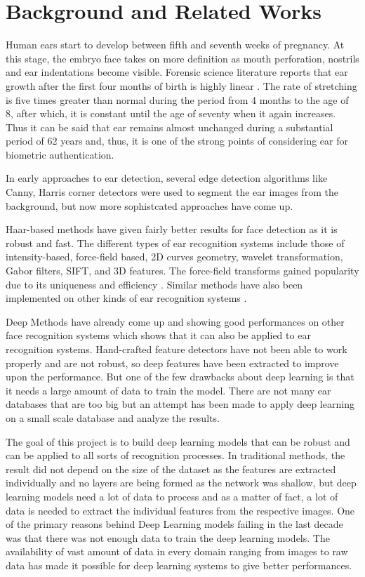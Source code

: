 \chapter{Background and Related Works}
\label{sec:back}

Human ears start to develop between fifth and seventh weeks of pregnancy. At this stage, the embryo face takes on more definition as mouth perforation, nostrils and ear indentations become visible. Forensic science literature reports that ear growth after the first four months of birth is highly linear \cite{Iannarelli}. The rate of stretching is five times greater than normal during the period from 4 months to the age of 8, after which, it is constant until the age of seventy when it again increases. Thus it can be said that ear remains almost unchanged during a substantial period of 62 years and, thus, it is one of the strong points of considering ear for biometric authentication.

In early approaches to ear detection, several edge detection algorithms like Canny\cite{canny}, Harris corner detectors\cite{harris} were used to segment the ear images from the background, but now more sophistcated approaches have come up.

Haar-based methods have given fairly better results for face detection as it is robust and fast. The different types of ear recognition systems include those of intensity-based, force-field based, 2D curves geometry, wavelet transformation, Gabor filters, SIFT, and 3D features. The force-field transforms gained popularity due to its uniqueness and efficiency \cite{hurley}. Similar methods have also been implemented on other kinds of ear recognition systems \cite{mu2004shape}\cite{daramolaNN}.

Deep Methods have already come up and showing good performances on other face recognition systems which shows that it can also be applied to ear recognition systems. Hand-crafted feature detectors have not been able to work properly and are not robust, so deep features have been extracted to improve upon the performance. But one of the few drawbacks about deep learning is that it needs a large amount of data to train the model. There are not many ear databases that are too big but an attempt has been made to apply deep learning on a small scale database and analyze the results.

The goal of this project is to build deep learning models that can be robust and can be applied to all sorts of recognition processes. In traditional methods, the result did not depend on the size of the dataset as the features are extracted individually and no layers are being formed as the network was shallow, but deep learning models need a lot of data to process and as a matter of fact, a lot of data is needed to extract the individual features from the respective images. One of the primary reasons behind Deep Learning models failing in the last decade was that there was not enough data to train the deep learning models. The availability of vast amount of data in every domain ranging from images to raw data has made it possible for deep learning systems to give better performances.

